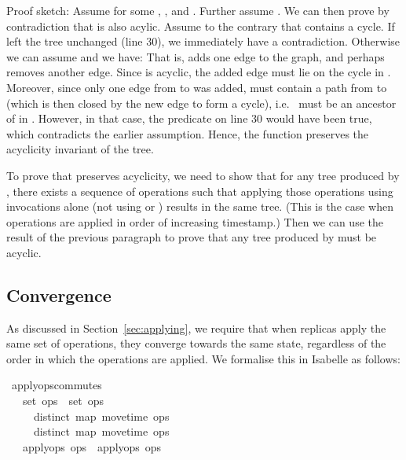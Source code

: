 \documentclass[sigconf]{acmart}
\renewenvironment{isabelle}{%
  \medbreak\noindent%
  \renewcommand{\isanewline}{\\}%
  \begin{minipage}{\columnwidth}%
  \begin{isabellebody}%
  \begin{tabbing}%
}{%
  \end{tabbing}%
  \end{isabellebody}%
  \end{minipage}%
  \medbreak%
}
\renewcommand{\isacartoucheopen}{}
\renewcommand{\isacartoucheclose}{}
\begin{document}
Proof sketch: Assume  for some , ,  and .
Further assume .
We can then prove by contradiction that  is also acylic.
Assume to the contrary that  contains a cycle.
If  left the tree unchanged (line 30), we immediately have a contradiction.
Otherwise we can assume  and we have:
\medbreak\noindent
{}
\medbreak\noindent
That is,  adds one edge  to the graph, and perhaps removes another edge.
Since  is acyclic, the added edge must lie on the cycle in .
Moreover, since only one edge from  to  was added,  must contain a path from  to  (which is then closed by the new edge to form a cycle), i.e.\  must be an ancestor of  in .
However, in that case, the predicate  on line 30 would have been true, which contradicts the earlier assumption.
Hence, the  function preserves the acyclicity invariant of the tree.

To prove that  preserves acyclicity, we need to show that for any tree produced by , there exists a sequence of operations such that applying those operations using  invocations alone (not using  or ) results in the same tree.
(This is the case when operations are applied in order of increasing timestamp.)
Then we can use the result of the previous paragraph to prove that any tree produced by  must be acyclic.

\subsection{Convergence}

As discussed in Section~\ref{sec:applying}, we require that when replicas apply the same set of operations, they converge towards the same state, regardless of the order in which the operations are applied.
We formalise this in Isabelle as follows:
\begin{isabelle}
\isamarkupfalse%
\ apply{\isacharunderscore}ops{\isacharunderscore}commutes{\isacharcolon}\isanewline
\ \ \ {\isacartoucheopen}set\ ops{}\ {\isacharequal}\ set\ ops{}{\isacartoucheclose}\isanewline
\ \ \ \ \ {\isacartoucheopen}distinct\ {\isacharparenleft}map\ move{\isacharunderscore}time\ ops{}{\isacharparenright}{\isacartoucheclose}\isanewline
\ \ \ \ \ {\isacartoucheopen}distinct\ {\isacharparenleft}map\ move{\isacharunderscore}time\ ops{}{\isacharparenright}{\isacartoucheclose}\isanewline
\ \ \ {\isacartoucheopen}apply{\isacharunderscore}ops\ ops{}\ {\isacharequal}\ apply{\isacharunderscore}ops\ ops{}{\isacartoucheclose}
\end{isabelle}
\end{document}
